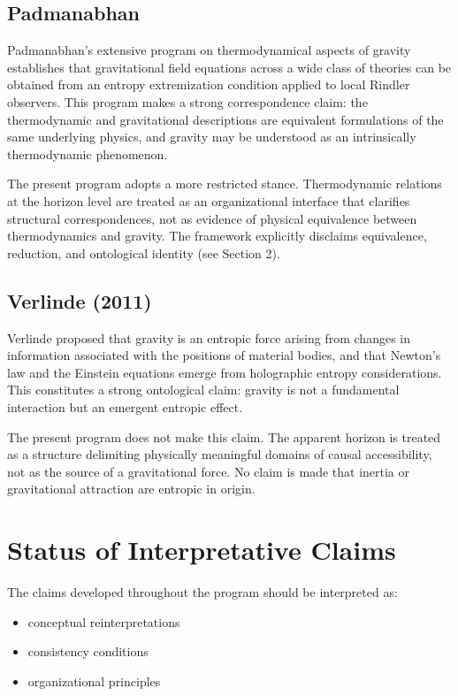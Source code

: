\documentclass[12pt,a4paper]{article}
\begin{document}
\subsection*{Padmanabhan}

Padmanabhan's extensive program on thermodynamical aspects of gravity establishes that gravitational field equations across a wide class of theories can be obtained from an entropy extremization condition applied to local Rindler observers. This program makes a strong correspondence claim: the thermodynamic and gravitational descriptions are equivalent formulations of the same underlying physics, and gravity may be understood as an intrinsically thermodynamic phenomenon.

The present program adopts a more restricted stance. Thermodynamic relations at the horizon level are treated as an organizational interface that clarifies structural correspondences, not as evidence of physical equivalence between thermodynamics and gravity. The framework explicitly disclaims equivalence, reduction, and ontological identity (see Section 2).

\subsection*{Verlinde (2011)}

Verlinde proposed that gravity is an entropic force arising from changes in information associated with the positions of material bodies, and that Newton's law and the Einstein equations emerge from holographic entropy considerations. This constitutes a strong ontological claim: gravity is not a fundamental interaction but an emergent entropic effect.

The present program does not make this claim. The apparent horizon is treated as a structure delimiting physically meaningful domains of causal accessibility, not as the source of a gravitational force. No claim is made that inertia or gravitational attraction are entropic in origin.

\section{Status of Interpretative Claims}

The claims developed throughout the program should be interpreted as:

\begin{itemize}
  \item conceptual reinterpretations
  \item consistency conditions
  \item organizational principles
\end{itemize}
\end{document}
